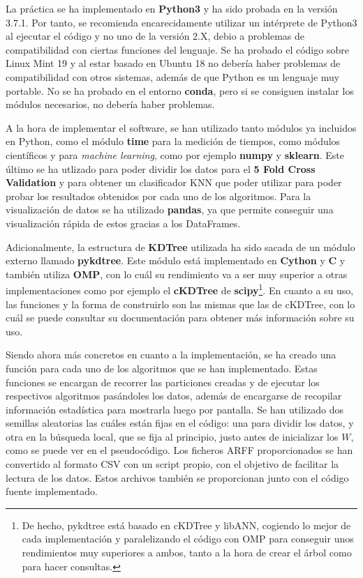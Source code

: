 \documentclass[11pt,a4paper]{article}
\begin{document}
La práctica se ha implementado en \textbf{Python3} y ha sido probada en la versión 3.7.1. Por tanto, se recomienda
encarecidamente utilizar un intérprete de Python3 al ejecutar el código y no uno de la versión 2.X, debio a problemas
de compatibilidad con ciertas funciones del lenguaje. Se ha probado el código sobre Linux Mint 19 y al estar basado en
Ubuntu 18 no debería haber problemas de compatibilidad con otros sistemas, además de que Python es un lenguaje muy portable.
No se ha probado en el entorno \textbf{conda}, pero si se consiguen instalar los módulos necesarios, no debería haber
problemas.

A la hora de implementar el software, se han utilizado tanto módulos ya incluidos en Python, como el módulo \textbf{time}
para la medición de tiempos, como módulos científicos y para \textit{machine learning}, como por ejemplo \textbf{numpy} y
\textbf{sklearn}. Este último se ha utlizado para poder dividir los datos para el \textbf{5 Fold Cross Validation}
y para obtener un clasificador KNN que poder utilizar para poder probar los resultados obtenidos por cada uno de los
algoritmos. Para la visualización de datos se ha utilizado \textbf{pandas}, ya que permite conseguir una visualización rápida
de estos gracias a los DataFrames.

Adicionalmente, la estructura de \textbf{KDTree} utilizada ha sido sacada de un módulo externo llamado
\textbf{pykdtree}\cite{pykdtree}. Este módulo está implementado en \textbf{Cython} y \textbf{C} y también utiliza
\textbf{OMP}, con lo cuál su rendimiento va a ser muy superior a otras implementaciones como por ejemplo el \textbf{cKDTree}
de \textbf{scipy}\footnote{De hecho, pykdtree está basado en cKDTree y libANN, cogiendo lo
mejor de cada implementación y paralelizando el código con OMP para conseguir unos rendimientos muy superiores a ambos,
tanto a la hora de crear el árbol como para hacer consultas.}. En cuanto a su uso, las funciones y la forma de construirlo
son las mismas que las de cKDTree, con lo cuál se puede consultar su documentación\cite{ckdtree} para obtener más información
sobre su uso.

Siendo ahora más concretos en cuanto a la implementación, se ha creado una función para cada uno de los algoritmos que se
han implementado. Estas funciones se encargan de recorrer las particiones creadas y de ejecutar los respectivos
algoritmos pasándoles los datos, además de encargarse de recopilar información estadística para mostrarla luego por
pantalla. Se han utilizado dos semillas aleatorias las cuáles están fijas en el código: una para dividir los datos, y otra en
la búsqueda local, que se fija al principio, justo antes de inicializar los $W$, como se puede ver en el pseudocódigo. Los
ficheros ARFF proporcionados se han convertido al formato CSV con un script propio, con el objetivo de facilitar la lectura
de los datos. Estos archivos también se proporcionan junto con el código fuente implementado.
\end{document}
